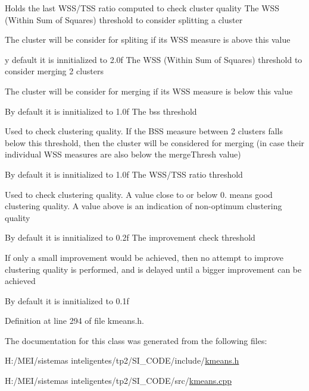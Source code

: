 Holds the last W\+S\+S/\+T\+SS ratio computed to check cluster quality The W\+SS (Within Sum of Squares) threshold to consider splitting a cluster

The cluster will be consider for spliting if its W\+SS measure is above this value

y default it is innitialized to 2.\+0f The W\+SS (Within Sum of Squares) threshold to consider merging 2 clusters

The cluster will be consider for merging if its W\+SS measure is below this value

By default it is innitialized to 1.\+0f The bss threshold

Used to check clustering quality. If the B\+SS measure between 2 clusters falls below this threshold, then the cluster will be considered for merging (in case their individual W\+SS measures are also below the \textquotesingle{}merge\+Thresh\textquotesingle{} value)

By default it is innitialized to 1.\+0f The W\+S\+S/\+T\+SS ratio threshold

Used to check clustering quality. A value close to or below 0. means good clustering quality. A value above is an indication of non-\/optimum clustering quality

By default it is innitialized to 0.\+2f The improvement check threshold

If only a small improvement would be achieved, then no attempt to improve clustering quality is performed, and is delayed until a bigger improvement can be achieved

By default it is innitialized to 0.\+1f 

Definition at line 294 of file kmeans.\+h.



The documentation for this class was generated from the following files\+:\begin{DoxyCompactItemize}
\item 
H\+:/\+M\+E\+I/sistemas inteligentes/tp2/\+S\+I\+\_\+\+C\+O\+D\+E/include/\hyperlink{kmeans_8h}{kmeans.\+h}\item 
H\+:/\+M\+E\+I/sistemas inteligentes/tp2/\+S\+I\+\_\+\+C\+O\+D\+E/src/\hyperlink{kmeans_8cpp}{kmeans.\+cpp}\end{DoxyCompactItemize}
